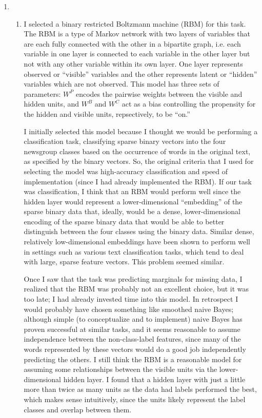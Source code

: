 \documentclass[12pt]{article}
\begin{document}
\begin{enumerate}
\item %
\begin{enumerate}
\item 
I selected a binary restricted Boltzmann machine (RBM) for this task. The RBM is a type of Markov network with two layers of variables that are each fully connected with the other in a bipartite graph, i.e. each variable in one layer is connected to each variable in the other layer but not with any other variable within its own layer. One layer represents observed or ``visible'' variables and the other represents latent or ``hidden'' variables which are not observed. This model has three sets of parameters: $W^P$ encodes the pairwise weights between the visible and hidden units, and $W^B$ and $W^C$ act as a bias controlling the propensity for the hidden and visible units, repsectively, to be ``on.''

I initially selected this model because I thought we would be performing a classification task, classifying sparse binary vectors into the four newsgroup classes based on the occurrence of words in the original text, as specified by the binary vectors. So, the original criteria that I used for selecting the model was high-accuracy classification and speed of implementation (since I had already implemented the RBM). If our task was classification, I think that an RBM would perform well since the hidden layer would represent a lower-dimensional ``embedding'' of the sparse binary data that, ideally, would be a dense, lower-dimensional encoding of the sparse binary data that would be able to better distinguish between the four classes using the binary data. Similar dense, relatively low-dimensional embeddings have been shown to perform well in settings such as various text classification tasks, which tend to deal with large, sparse feature vectors. This problem seemed similar.

Once I saw that the task was predicting marginals for missing data, I realized that the RBM was probably not an excellent choice, but it was too late; I had already invested time into this model. In retrospect I would probably have chosen something like smoothed naive Bayes; although simple (to conceptualize and to implement) naive Bayes has proven successful at similar tasks, and it seems reasonable to assume independence between the non-class-label features, since many of the words represented by these vectors would do a good job independently predicting the others. I still think the RBM is a reasonable model for assuming some relationships between the visible units via the lower-dimensional hidden layer. I found that a hidden layer with just a little more than twice as many units as the data had labels performed the best, which makes sense intuitively, since the units likely represent the label classes and overlap between them. 


\end{enumerate}
\end{enumerate}
\end{document}
